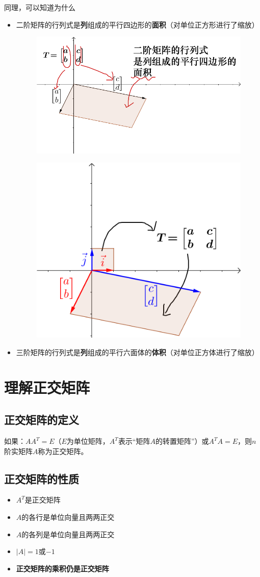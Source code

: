 \documentclass[12pt]{article}
\begin{document}
同理，可以知道为什么
\begin{itemize}
    \item 二阶矩阵的行列式是\textbf{列}组成的平行四边形的\textbf{面积}（对单位正方形进行了缩放）
\begin{figure}[H]
    \centering
    \includegraphics[width=.5\textwidth]{fig/UnderstandDeterminant_3.png}
\end{figure}
\begin{figure}[H]
    \centering
    \includegraphics[width=.5\textwidth]{fig/UnderstandDeterminant_4.png}
\end{figure}  
    \item 三阶矩阵的行列式是\textbf{列}组成的平行六面体的\textbf{体积}（对单位正方体进行了缩放）
\end{itemize}

\section{理解正交矩阵\cite{Fantastic_Matrix_1}}
\subsection{正交矩阵的定义}
如果：$AA^T=E$（$E$为单位矩阵，$A^T$表示“矩阵$A$的转置矩阵”）或$A^TA=E$，则$n$阶实矩阵$A$称为正交矩阵。

\subsection{正交矩阵的性质}
\begin{itemize}
\setlength{\itemsep}{0pt}
\setlength{\parsep}{0pt}
\setlength{\parskip}{0pt}
    \item $A^T$是正交矩阵
    \item $A$的各行是单位向量且两两正交
    \item $A$的各列是单位向量且两两正交
    \item $|A|=1$或$-1$
    \item \textbf{正交矩阵的乘积仍是正交矩阵}
\end{itemize}
\end{document}
